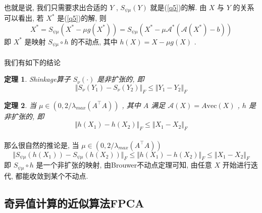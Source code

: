 \documentclass[UTF8]{ctexart}
\newtheorem{theo}{\bf 定理}[section]
\numberwithin{equation}{section}
\begin{document}
			\paragraph{}
				\quad 也就是说, 我们只需要求出合适的 $Y$ , $S_{\psi \mu}(Y)$ 就是(\ref{q5})的解. 由 $X$ 与 $Y$ 的关系可以看出, 若 $X^*$ 是(\ref{q5})的解, 则
				\begin{equation}
						X^*
					=	S_{\psi \mu}(X^* - \mu g(X^*))
					=	S_{\psi \mu}(X^* - \mu \mathcal{A}^*(\mathcal{A}(X^*) - b))
				\end{equation}
				即 $X^*$ 是映射 $S_{\psi \mu} \circ h$ 的不动点, 其中 $h(X) = X - \mu g(X)$ .

			\paragraph{}
				\quad 我们有如下的结论
				\begin{theo}
					Shinkage算子 $S_\nu(\cdot)$ 是非扩张的, 即
					\begin{equation}
						\Vert{S_\nu(Y_1) - S_\nu(Y_2)}\Vert_F \le \Vert{Y_1 - Y_2}\Vert_F
					\end{equation}
				\end{theo}

				\begin{theo}
					当 $\mu \in (0, 2/\lambda_{max}(A ^\top A))$ , 其中 $A$ 满足 $\mathcal{A}(X) = A \text{vec}(X)$ , $h$ 是非扩张的, 即
					\begin{equation}
						\Vert{h(X_1) - h(X_2)}\Vert_F \le \Vert{X_1 - X_2}\Vert_F
					\end{equation}
				\end{theo}
				
			
			\paragraph{}
				\quad 那么很自然的推论是, 当 $\mu \in (0, 2/\lambda_{max}(A ^\top A))$
					\begin{equation}
						\Vert{S_{\psi \mu}(h(X_1)) - S_{\psi \mu}(h(X_2))}\Vert_F \le \Vert{h(X_1) - h(X_2)}\Vert_F \le \Vert{X_1 - X_2}\Vert_F
					\end{equation}
				即 $S_{\psi \mu} \circ h$ 是一个非扩张的映射, 由Brouwer不动点定理可知, 由任意 $X$ 开始进行迭代, 都能收敛到某个不动点.

		\subsection{奇异值计算的近似算法FPCA}
\end{document}
